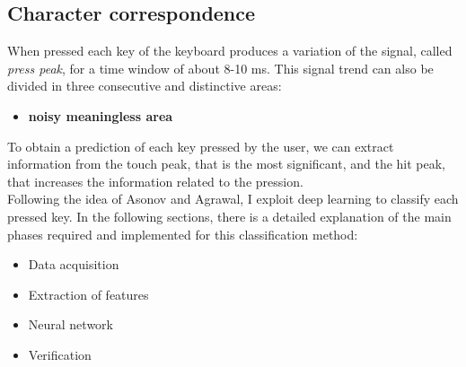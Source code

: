 \subsection{Character correspondence}
When pressed each key of the keyboard produces a variation of the signal, called \textit{press peak}, for a time window of about 8-10 ms\cite{keyboard_acoustic}. This signal trend can also be divided in three consecutive and distinctive areas:
\begin{itemize}
\item{\textbf{noisy meaningless area}}
\end{itemize}
To obtain a prediction of each key pressed by the user, we can extract information from the touch peak, that is the most significant, and the hit peak, that increases the information related to the pression.\\
Following the idea of Asonov and Agrawal, I exploit deep learning to classify each pressed key. In the following sections, there is a detailed explanation of the main phases required and implemented for this classification method:
\begin{itemize}
\item{Data acquisition}
\item{Extraction of features}
\item{Neural network}
\item{Verification}
\end{itemize}

